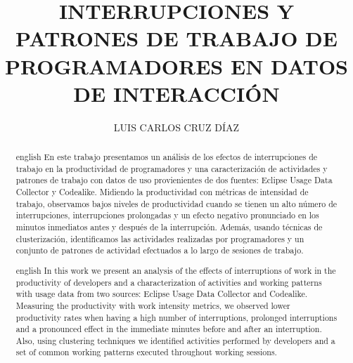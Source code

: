 \documentclass{tesisITAM}
\title{INTERRUPCIONES Y PATRONES DE TRABAJO DE PROGRAMADORES EN DATOS DE INTERACCIÓN}
\author{LUIS CARLOS CRUZ DÍAZ}
\begin{document}
	 {
		
		\newcommand{\changedforreviewer}[1]{\textcolor{blue}{#1}}
		
		
		
		\newenvironment{changedforreviewerlong}
			{\begin{color}{blue}}
			{\end{color}}
		
	}{
	
		\newcommand{\changedforreviewer}[1]{#1}
		
		
		
		\newenvironment{changedforreviewerlong}%
		
		{}
		
		{}
		
	}

	
	\maketitle
	\publicationrights
	
	\large

	
	\begin{abstract}{english}
		En este trabajo presentamos un análisis de los efectos de interrupciones de trabajo en la productividad de programadores y una caracterización de actividades y patrones de trabajo con datos de uso provienientes de dos fuentes: Eclipse Usage Data Collector y Codealike. Midiendo la productividad con métricas de intensidad de trabajo, observamos bajos niveles de productividad cuando se tienen un alto número de interrupciones, interrupciones prolongadas y un efecto negativo pronunciado en los minutos inmediatos antes y después de la interrupción. Además, usando técnicas de clusterización, identificamos las actividades realizadas por programadores y un conjunto de patrones de actividad efectuados a lo largo de sesiones de trabajo.
	\end{abstract}

	\begin{abstract}{english}
		In this work we present an analysis of the effects of interruptions of work in the productivity of developers and a characterization of activities and working patterns with usage data from two sources: Eclipse Usage Data Collector and Codealike. Measuring the productivity with work intensity metrics, we observed lower productivity rates when having a high number of interruptions, prolonged interruptions and a pronounced effect in the immediate minutes before and after an interruption. Also, using clustering techniques we identified activities performed by developers and a set of common working patterns executed throughout working sessions.
	\end{abstract}
\end{document}
